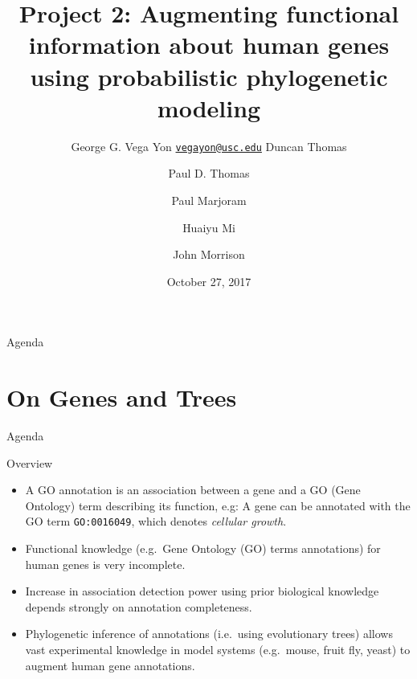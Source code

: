 \documentclass[9pt,ignorenonframetext,]{beamer}
\title{Project 2: Augmenting functional information about human genes using
probabilistic phylogenetic modeling}
\author[
Vega Yon
]{George G. Vega Yon
\linebreak[4] \href{mailto:vegayon@usc.edu}{\nolinkurl{vegayon@usc.edu}}
\linebreak[4] \footnotesize Duncan Thomas \and Paul D. Thomas \and Paul
Marjoram \and Huaiyu Mi \and John Morrison \normalsize}
\institute[USC]{Department of Preventive Medicine \linebreak[4] University of Southern
California}
\date{October 27, 2017}
\begin{document}
{


\begin{frame}
\titlepage
\end{frame}
}

\begin{frame}{Agenda}

\tableofcontents{}

\end{frame}

\section{On Genes and Trees}\label{on-genes-and-trees}

\begin{frame}{Agenda}

\tableofcontents[currentsection]

\end{frame}

\begin{frame}[fragile]{Overview}

\begin{itemize}
\item
  A GO annotation is an association between a gene and a GO (Gene
  Ontology) term describing its function, e.g: A gene can be annotated
  with the GO term \texttt{GO:0016049}, which denotes \emph{cellular
  growth}.\pause
\item
  Functional knowledge (e.g.~Gene Ontology (GO) terms annotations) for
  human genes is very incomplete.\pause
\item
  Increase in association detection power using prior biological
  knowledge depends strongly on annotation completeness.\pause
\item
  Phylogenetic inference of annotations (i.e.~using evolutionary trees)
  allows vast experimental knowledge in model systems (e.g.~mouse, fruit
  fly, yeast) to augment human gene annotations.
\end{itemize}

\end{frame}
\end{document}

